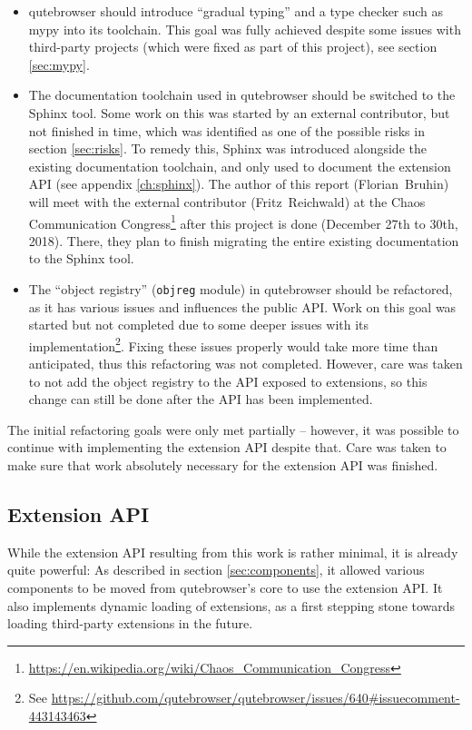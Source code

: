 \begin{itemize}
  \item qutebrowser should introduce ``gradual typing'' and a type checker such
    as mypy into its toolchain. This goal was fully achieved despite some issues
    with third-party projects (which were fixed as part of this project), see
    section \ref{sec:mypy}.
  \item The documentation toolchain used in qutebrowser should be switched to
    the Sphinx tool. Some work on this was started by an external contributor,
    but not finished in time, which was identified as one of the possible risks
    in section \ref{sec:risks}. To remedy this, Sphinx was introduced alongside
    the existing documentation toolchain, and only used to document the
    extension API (see appendix \ref{ch:sphinx}). The author of this report
    (Florian~Bruhin) will meet with the external contributor (Fritz~Reichwald)
    at the  Chaos Communication
    Congress\footnote{\url{https://en.wikipedia.org/wiki/Chaos_Communication_Congress}}
    after this project is done (December 27th to 30th, 2018).
    There, they plan to finish migrating the entire existing documentation to
    the Sphinx tool.
  \item The ``object registry'' (\texttt{objreg} module) in qutebrowser should
    be refactored, as it has various issues and influences the public API. Work
    on this goal was started but not completed due to some deeper issues with
    its implementation\footnote{See \url{https://github.com/qutebrowser/qutebrowser/issues/640\#issuecomment-443143463}}.
    Fixing these issues properly would take more time than anticipated, thus this
    refactoring was not completed. However, care was taken to not add the object
    registry to the API exposed to extensions, so this change can still be done
    after the API has been implemented.
\end{itemize}

The initial refactoring goals were only met partially -- however, it was
possible to continue with implementing the extension API despite that. Care was
taken to make sure that work absolutely necessary for the extension API was
finished.

\subsection{Extension API}

While the extension API resulting from this work is rather minimal, it is
already quite powerful: As described in section \ref{sec:components}, it allowed
various components to be moved from qutebrowser's core to use the extension API.
It also implements dynamic loading of extensions, as a first stepping stone
towards loading third-party extensions in the future.

